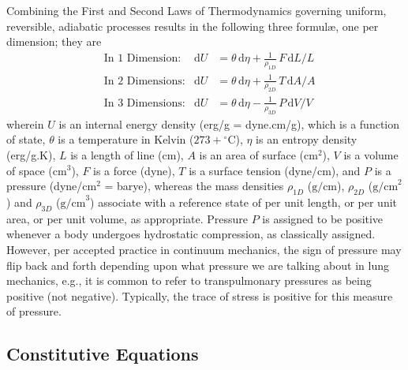 Combining the First and Second Laws of Thermo\-dynamics governing uniform, reversible, adiabatic processes results in the following three formul\ae, one per dimension; they are
\begin{subequations}
    \label{thermoelasticLaws}
    \begin{align}
    \mbox{} & \text{In 1 Dimension:} & 
    \mathrm{d}U & = \theta \, \mathrm{d} \eta +
    \tfrac{1}{\rho_{1D}} \, F \, \mathrm{d}L / L
    \label{thermoelastic1Dlaw} \\
    \mbox{} & \text{In 2 Dimensions:} &
    \mathrm{d}U & = \theta \, \mathrm{d} \eta + 
    \tfrac{1}{\rho_{2D}} \, T \, \mathrm{d}A / \! A
    \label{thermoelastic2Dlaw} \\
    \mbox{} & \text{In 3 Dimensions:} &
    \mathrm{d}U & = \theta \, \mathrm{d} \eta - 
    \tfrac{1}{\rho_{3D}} \, P \, \mathrm{d}V \! / V \!
    \label{thermoelastic3Dlaw}
    \end{align}
\end{subequations}
wherein $U$ is an internal energy density (erg/g = dyne.cm/g), which is a function of state, $\theta$ is a temperature in Kelvin ($273 + \mbox{}^{\circ}$C), $\eta$ is an entropy density (erg/g.K), $L$ is a length of line (cm), $A$ is an area of surface ($\text{cm}^2$), $V$ is a volume of space ($\text{cm}^3$), $F$ is a force (dyne), $T$ is a surface tension (dyne/cm), and $P$ is a pressure (dyne/$\text{cm}^2$ = barye), whereas the mass densities $\rho_{1D}$ ($\text{g/cm}$), $\rho_{2D}$ ($\text{g/cm}^2$) and $\rho_{3D}$ ($\text{g/cm}^3$) associate with a reference state of per unit length, or per unit area, or per unit volume, as appropriate.  Pressure $P$ is assigned to be positive whenever a body undergoes hydro\-static compression, as classically assigned.  However, per accepted practice in continuum mechanics, the sign of pressure may flip back and forth depending upon what pressure we are talking about in lung mechanics, e.g., it is common to refer to transpulmonary pressures as being positive (not negative). Typically, the trace of stress is positive for this measure of pressure.

\subsection{Constitutive Equations}

